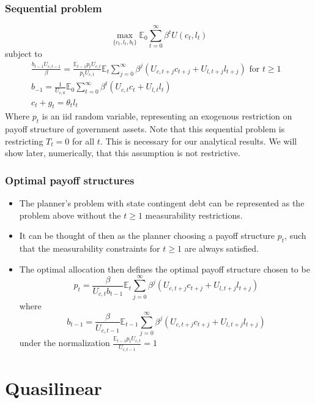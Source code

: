 \documentclass{beamer}
\newcommand{\EE}{\mathbb E}
\begin{document}
 
 \begin{frame}
 \frametitle{Sequential problem}  
\[
	\max_{\{c_t,l_t,b_t\}} \EE_0\sum_{t=0}^\infty \beta^t U(c_t,l_t)
\]subject to
\begin{align*}
	\frac{b_{t-1}U_{c,t-1}}{\beta} = \frac{\EE_{t-1} p_t U_{c,t}}{p_t U_{c,t}}\EE_t\sum_{j=0}^\infty\beta^j\left( U_{c,t+j}c_{t+j}+U_{l,t+j}l_{t+j}\right)\text{  for $t\geq 1$ }\\
	b_{-1} = \frac1{U_{c,0}}\EE_0\sum_{t=0}^\infty \beta^t\left(U_{c,t}c_t+U_{l,t}l_t\right)\\
	c_t + g_t = \theta_t l_t
\end{align*}
Where $p_t$ is an iid random variable, representing an exogenous restriction on payoff structure of government assets.  Note that this sequential problem is restricting $T_t = 0$ for all $t$.  This is necessary for our analytical results.  We will show later, numerically, that this assumption is not restrictive.
  \end{frame}
  
 \begin{frame}
\frametitle{Optimal payoff structures}
\begin{itemize}
\item The planner's problem with state contingent debt can be represented as the problem above without the $t\geq1$ measurability restrictions.
\item  It can be thought of then as the planner choosing a payoff structure $p_t$, such that the measurability constraints for $t\geq 1$ are always satisfied.
\item  The optimal allocation then defines the optimal payoff structure chosen to be
\[
	p_t = \frac{\beta}{U_{c,t}b_{t-1}}\EE_t\sum_{j=0}^\infty\beta^j\left(U_{c,t+j}c_{t+j}+U_{l,t+j}l_{t+j}\right)
\]where
\[
	b_{t-1} = \frac{\beta}{U_{c,t-1}}\EE_{t-1}\sum_{j=0}^\infty\beta^j\left(U_{c,t+j}c_{t+j}+U_{l,t+j}l_{t+j}\right)
\]under the normalization $\frac{\EE_{t-1} p_t U_{c,t}}{U_{c,t-1}} = 1$
\end{itemize}
\end{frame} 

\section{Quasilinear}
\subsection{}
 
\end{document}
